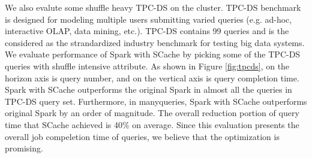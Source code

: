 We also evalute some shuffle heavy TPC-DS\cite{tpcds} on the cluster. TPC-DS benchmark is designed for modeling multiple users submitting varied queries (e.g. ad-hoc, interactive OLAP, data mining, etc.). TPC-DS contains 99 queries and is the considered as the  strandardized industry benchmark for testing big data systems. We evaluate performance of Spark with SCache by picking some of the TPC-DS queries with shuffle intensive attribute. As shown in Figure \ref{fig:tpcds}, on the horizon axis is query number, and on the vertical axis is query completion time. Spark with SCache outperforms the original Spark in almost all the queries in TPC-DS query set. Furthermore, in manyqueries, Spark with SCache outperforms original Spark by an order of magnitude. The overall reduction portion of query time that SCache achieved is 40\% on average. Since this evaluation presents the overall job compeletion time of queries, we believe that the optimization is promising.
